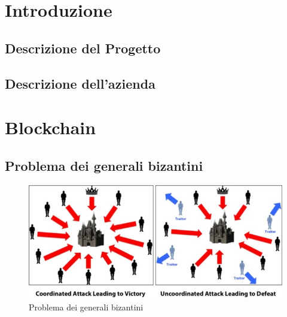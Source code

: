 \documentclass[12pt,titlepage]{report}
\begin{document}
\tableofcontents

\chapter{Introduzione}
\section{Descrizione del Progetto}
\section{Descrizione dell’azienda}

\chapter{Blockchain}
\section{Problema dei generali bizantini}
\begin{figure}[h]
	\includegraphics[width=\textwidth]{BF}
	\centering
	\caption{Problema dei generali bizantini}
	\label{fig:ByzantinFault}
\end{figure}
\end{document}
